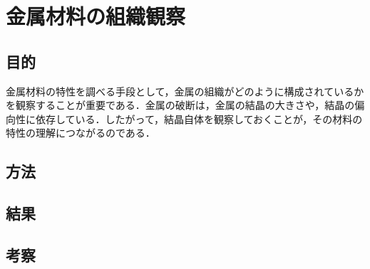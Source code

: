 %
%
%
\section{金属材料の組織観察}
\label{taskA}

%
%
\subsection{目的}
\label{taskA_purpose}
金属材料の特性を調べる手段として，金属の組織がどのように構成されているかを観察することが重要である．金属の破断は，金属の結晶の大きさや，結晶の偏向性に依存している．したがって，結晶自体を観察しておくことが，その材料の特性の理解につながるのである．

%
%
\subsection{方法}
\label{taskA_method}

%
%
\subsection{結果}
\label{taskA_result}

%
%
\subsection{考察}
\label{taskA_consideration}